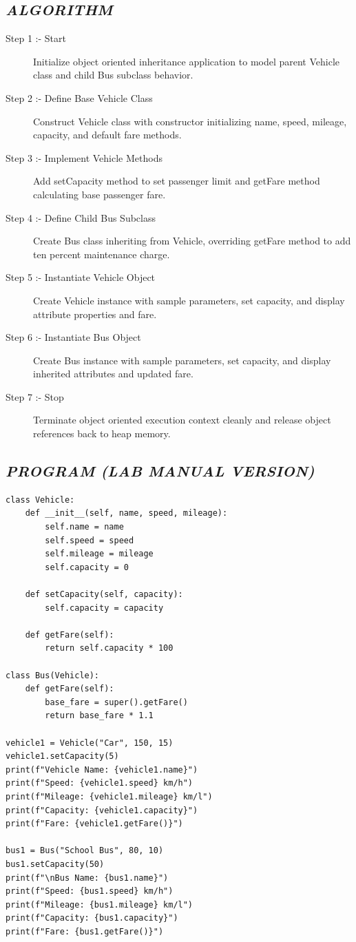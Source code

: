 \documentclass[11pt,a4paper]{article}
\begin{document}
\subsection*{\textit{ALGORITHM}}
\begin{description}
  \item[Step 1 :- Start] Initialize object oriented inheritance application to model parent Vehicle class and child Bus subclass behavior.
  \item[Step 2 :- Define Base Vehicle Class] Construct Vehicle class with constructor initializing name, speed, mileage, capacity, and default fare methods.
  \item[Step 3 :- Implement Vehicle Methods] Add setCapacity method to set passenger limit and getFare method calculating base passenger fare.
  \item[Step 4 :- Define Child Bus Subclass] Create Bus class inheriting from Vehicle, overriding getFare method to add ten percent maintenance charge.
  \item[Step 5 :- Instantiate Vehicle Object] Create Vehicle instance with sample parameters, set capacity, and display attribute properties and fare.
  \item[Step 6 :- Instantiate Bus Object] Create Bus instance with sample parameters, set capacity, and display inherited attributes and updated fare.
  \item[Step 7 :- Stop] Terminate object oriented execution context cleanly and release object references back to heap memory.
\end{description}

\subsection*{\textit{PROGRAM (LAB MANUAL VERSION)}}
\begin{lstlisting}[style=pythonstyle]
class Vehicle: 
    def __init__(self, name, speed, mileage): 
        self.name = name 
        self.speed = speed 
        self.mileage = mileage 
        self.capacity = 0 
 
    def setCapacity(self, capacity): 
        self.capacity = capacity 

    def getFare(self): 
        return self.capacity * 100 
 
class Bus(Vehicle): 
    def getFare(self): 
        base_fare = super().getFare() 
        return base_fare * 1.1 
 
vehicle1 = Vehicle("Car", 150, 15) 
vehicle1.setCapacity(5) 
print(f"Vehicle Name: {vehicle1.name}") 
print(f"Speed: {vehicle1.speed} km/h") 
print(f"Mileage: {vehicle1.mileage} km/l") 
print(f"Capacity: {vehicle1.capacity}") 
print(f"Fare: {vehicle1.getFare()}") 
 
bus1 = Bus("School Bus", 80, 10) 
bus1.setCapacity(50) 
print(f"\nBus Name: {bus1.name}") 
print(f"Speed: {bus1.speed} km/h") 
print(f"Mileage: {bus1.mileage} km/l") 
print(f"Capacity: {bus1.capacity}") 
print(f"Fare: {bus1.getFare()}")
\end{lstlisting}
\end{document}
